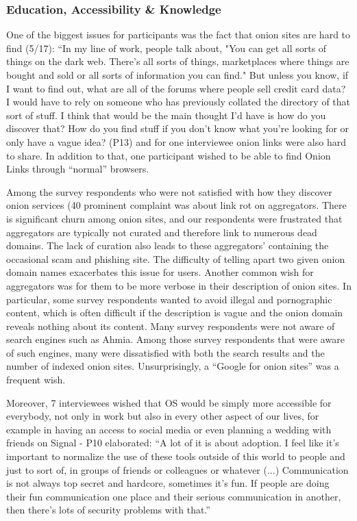 \subsubsection{Education, Accessibility \& Knowledge}

One of the biggest issues for participants was the fact that onion sites are hard to find (5/17): “In my line of work, people talk about, "You can get all sorts of things on the dark web. There's all sorts of things, marketplaces where things are bought and sold or all sorts of information you can find." But unless you know, if I want to find out, what are all of the forums where people sell credit card data? I would have to rely on someone who has previously collated the directory of that sort of stuff. I think that would be the main thought I'd have is how do you discover that? How do you find stuff if you don't know what you're looking for or only have a vague idea? (P13) and for one interviewee onion links were also hard to share.  In addition to that, one participant wished to be able to find Onion Links through “normal” browsers. 

Among the survey respondents who were not satisfied with how they discover onion services (40%
prominent complaint was about link rot on aggregators.  There is significant
churn among onion sites, and our respondents were frustrated that aggregators
are typically not curated and therefore link to numerous dead domains.  The lack
of curation also leads to these aggregators' containing the occasional scam and
phishing site.  The difficulty of telling apart two given onion domain names
exacerbates this issue for users.  Another common wish for aggregators was for
them to be more verbose in their description of onion sites.  In particular,
some survey respondents wanted to avoid illegal and pornographic content, which is often
difficult if the description is vague and the onion domain reveals nothing about
its content.  Many survey respondents were not aware of search engines such as Ahmia.
Among those survey respondents that were aware of such engines, many were dissatisfied with both the search results and
the number of indexed onion sites.  Unsurprisingly, a ``Google for onion sites''
was a frequent wish.


Moreover, 7 interviewees wished that OS would be simply more accessible for everybody, not only in work but also in every other aspect of our lives, for example in having an access to social media or even planning a wedding with friends on Signal - P10 elaborated: ``A lot of it is about adoption. I feel like it's important to normalize the use of these tools outside of this world to people and just to sort of, in groups of friends or colleagues or whatever (...) Communication is not always top secret and hardcore, sometimes it's fun. If people are doing their fun communication one place and their serious communication in another, then there's lots of security problems with that.'' 

